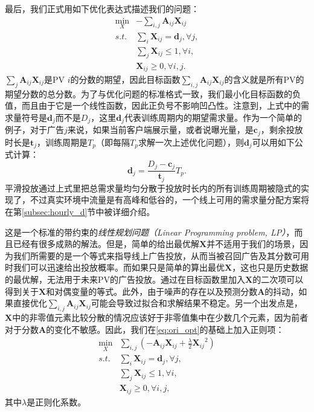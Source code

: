 最后，我们正式用如下优化表达式描述我们的问题：
\begin{equation}
\begin{aligned}
\min_X &-\sum_{i,j} \bm{A}_{ij}\bm{X}_{ij} \\
s.t. & \sum_i \bm{X}_{ij} = \bm{d}_j, \forall j, \\
& \sum_j \bm{X}_{ij} \le 1, \forall i, \\
& \bm{X}_{ij} \ge 0, \forall i, j. 
\label{eq:ori_opt}
\end{aligned}
\end{equation}
$\sum_{j} \bm{A}_{ij}\bm{X}_{ij}$是PV $i$的分数的期望，因此目标函数$\sum_{i,j} \bm{A}_{ij}\bm{X}_{ij}$的含义就是所有PV的期望分数的总分数。为了与优化问题的标准格式一致，我们最小化目标函数的负值，而且由于它是一个线性函数，因此正负号不影响凹凸性。注意到，上式中的需求量符号是$\bm{d}_j$而不是$D_j$，这里$\bm{d}_j$代表训练周期内的期望需求量。作为一个简单的例子，对于广告$j$来说，如果当前客户端展示量，或者说曝光量，是$\bm{c}_j$，剩余投放时长是$\bm{t}_j$，训练周期是$T_p$（即每隔$T_p$求解一次上述优化问题），则$\bm{d}_j$可以用如下公式计算：
\begin{equation}
\bm{d}_j = \frac{D_j - \bm{c}_j}{\bm{t}_j}T_{p}. \label{eq:avg}
\end{equation}
平滑投放通过上式里把总需求量均匀分散于投放时长内的所有训练周期被隐式的实现了，不过真实环境中流量是有高峰和低谷的，一个线上可用的需求量分配方案将在第\ref{subsec:hourly_d}节中被详细介绍。

这是一个标准的带约束的\textit{线性规划问题（Linear Programming problem, LP）}，而且已经有很多成熟的解法。但是，简单的给出最优解$\bm{X}$并不适用于我们的场景，因为我们所需要的是一个等式来指导线上广告投放，从而当被召回广告及其分数可用时我们可以迅速给出投放概率。而如果只是简单的算出最优$\bm{X}$，这也只是历史数据的最优解，无法用于未来PV的广告投放。通过在目标函数里加入$\bm{X}$的二次项可以得到关于$\bm{X}$和对偶变量的等式。此外，由于噪声的存在以及预测分数$\bm{A}$的抖动，如果直接优化$\sum_{i,j} \bm{A}_{ij}\bm{X}_{ij}$可能会导致过拟合和求解结果不稳定。另一个出发点是，$\bm{X}$中的非零值元素比较分散的情况应该好于非零值集中在少数几个元素，因为前者对于分数$\bm{A}$的变化不敏感。因此，我们在\eqref{eq:ori_opt}的基础上加入正则项：
\begin{equation}
\begin{aligned}
\min_X &\sum_{i,j}  (-\bm{A}_{ij}\bm{X}_{ij} + \frac{\lambda}{2}{\bm{X}_{ij}}^2) \\
s.t. & \sum_i \bm{X}_{ij} = \bm{d}_j, \forall j, \\
& \sum_j \bm{X}_{ij} \le 1, \forall i, \\
& \bm{X}_{ij} \ge 0, \forall i, j, 
\label{eq:opt}
\end{aligned}
\end{equation}
其中$\lambda$是正则化系数。

